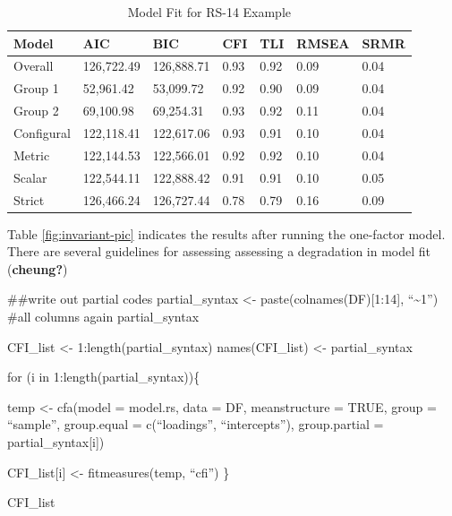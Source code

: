 \documentclass[
  man]{apa6}
\begin{document}
\begin{table}[tbp]

\begin{center}
\begin{threeparttable}

\caption{\label{tab:rs-table}Model Fit for RS-14 Example}

\begin{tabular}{lllllll}
\toprule
Model & AIC & BIC & CFI & TLI & RMSEA & SRMR\\
\midrule
Overall & 126,722.49 & 126,888.71 & 0.93 & 0.92 & 0.09 & 0.04\\
Group 1 & 52,961.42 & 53,099.72 & 0.92 & 0.90 & 0.09 & 0.04\\
Group 2 & 69,100.98 & 69,254.31 & 0.93 & 0.92 & 0.11 & 0.04\\
Configural & 122,118.41 & 122,617.06 & 0.93 & 0.91 & 0.10 & 0.04\\
Metric & 122,144.53 & 122,566.01 & 0.92 & 0.92 & 0.10 & 0.04\\
Scalar & 122,544.11 & 122,888.42 & 0.91 & 0.91 & 0.10 & 0.05\\
Strict & 126,466.24 & 126,727.44 & 0.78 & 0.79 & 0.16 & 0.09\\
\bottomrule
\end{tabular}

\end{threeparttable}
\end{center}

\end{table}

Table \ref{fig:invariant-pic} indicates the results after running the one-factor model. There are several guidelines for assessing assessing a degradation in model fit (\textbf{cheung?})

\#\#write out partial codes
partial\_syntax \textless- paste(colnames(DF){[}1:14{]}, ``\textasciitilde1'') \#all columns again
partial\_syntax

CFI\_list \textless- 1:length(partial\_syntax)
names(CFI\_list) \textless- partial\_syntax

for (i in 1:length(partial\_syntax))\{

temp \textless- cfa(model = model.rs,
data = DF,
meanstructure = TRUE,
group = ``sample'',
group.equal = c(``loadings'', ``intercepts''),
group.partial = partial\_syntax{[}i{]})

CFI\_list{[}i{]} \textless- fitmeasures(temp, ``cfi'')
\}

CFI\_list
\end{document}
